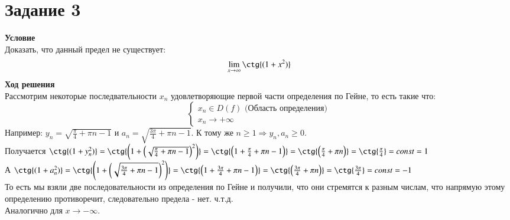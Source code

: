 \newpage
\section{Задание 3} 
{\bf\large Условие} \\
Доказать, что данный предел не существует:
\[
    \lim_{x\rightarrow\infty}{\ctg{(1+x^2)}}
\]
{\bf\large Ход решения} \\
Рассмотрим некоторые последвательности $x_n$ удовлетворяющие первой части определения по Гейне, то есть такие что:
\begin{equation*}
    \begin{cases}
        x_n \in D(f) \text{ (Область определения)} \\
        x_n \rightarrow +\infty
    \end{cases}
\end{equation*}
Например: $y_n = \sqrt{\frac{\pi}{4}+\pi n -1}$ и $a_n = \sqrt{\frac{3\pi}{4}+\pi n -1}$. К тому же $n\geq1\Rightarrow y_n,a_n\geq 0$. \\
Получается $\ctg{(1+y_n^2)}= \ctg{\left(1+\left(\sqrt{\frac{\pi}{4}+\pi n -1}\right)^2\right)}=\ctg{\left(1+\frac{\pi}{4}+\pi n -1\right)}=\ctg{\left(\frac{\pi}{4}+\pi n\right)}=\ctg{\frac{\pi}{4}}=const=1$\\
А $\ctg{(1+a_n^2)} = \ctg{\left(1+\left(\sqrt{\frac{3\pi}{4}+\pi n -1}\right)^2\right)}=\ctg{\left(1+\frac{3\pi}{4}+\pi n -1\right)}=\ctg{\left(\frac{3\pi}{4}+\pi n\right)}=\ctg{\frac{3\pi}{4}}=const=-1$\\
То есть мы взяли две последовательности из определения по Гейне и получили, что они стремятся к разным числам, что напрямую этому определению противоречит, следовательно предела - нет. ч.т.д. \\
Аналогично для $x \rightarrow -\infty$.